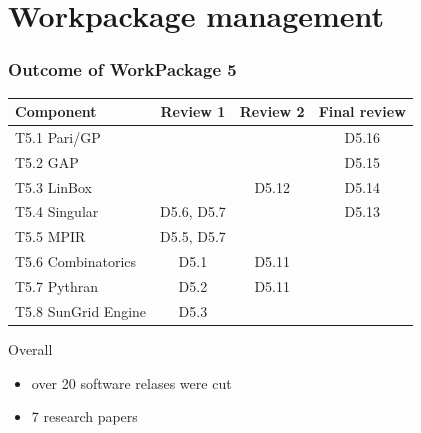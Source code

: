 \documentclass{beamer}
\begin{document}
\section{Workpackage management}
\begin{frame}
  \frametitle{Outcome of WorkPackage 5}

  \begin{tabular}{lccc}
    \toprule
    Component & Review 1 & Review 2 & Final review\\
    \midrule
    T5.1 Pari/GP & & & {\color{green} D5.16} \\
    T5.2 GAP     & & & {\color{green} D5.15} \\
    T5.3 LinBox  & & \alert{D5.12} & {\color{green} D5.14} \\
    T5.4 Singular& D5.6, D5.7 & & {\color{green} D5.13} \\
    T5.5 MPIR    & D5.5, D5.7& & \\
    T5.6 Combinatorics  & D5.1& \alert{D5.11} & \\
    T5.7 Pythran        & D5.2 & \alert{D5.11} & \\
    T5.8 SunGrid Engine & D5.3 & & \\
    \bottomrule
    
  \end{tabular}

  \vspace{1em}
  
  Overall
  \begin{itemize}
  \item over 20 software relases were cut
  \item 7 research papers
  \end{itemize}
\end{frame}
\end{document}
